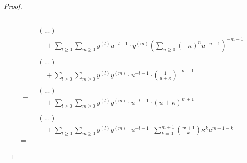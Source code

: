 \begin{proof}
\begin{enumerate}
$$\begin{aligned}
\begin{aligned}
                                    \end{aligned}
                                    \\
                                    & =
                                    \begin{aligned}
                                        & (...)
                                        \\
                                        & \quad + \sum_{l \geq 0} \sum_{m \geq 0} y^{(l)} u^{-l - 1} \cdot y^{(m)} \left( \sum_{n \geq 0} (-\kappa)^n u^{-n - 1} \right)^{-m - 1}
                                    \end{aligned}
                                    \\
                                    & =
                                    \begin{aligned}
                                        & (...)
                                        \\
                                        & \quad + \sum_{l \geq 0} \sum_{m \geq 0} y^{(l)} y^{(m)} \cdot u^{-l - 1} \cdot \left( \frac{1}{u + \kappa} \right)^{-m - 1}
                                    \end{aligned}
                                    \\
                                    & =
                                    \begin{aligned}
                                        & (...)
                                        \\
                                        & \quad + \sum_{l \geq 0} \sum_{m \geq 0} y^{(l)} y^{(m)} \cdot u^{-l - 1} \cdot (u + \kappa)^{m + 1}
                                    \end{aligned}
                                    \\
                                    & = 
                                    \begin{aligned}
                                        & (...)
                                        \\
                                        & \quad + \sum_{l \geq 0} \sum_{m \geq 0} y^{(l)} y^{(m)} \cdot u^{-l - 1} \cdot \sum_{k = 0}^{m + 1} \binom{m + 1}{k} \kappa^k u^{m + 1 - k}
                                    \end{aligned}
                                    \\
                                    & =

\end{aligned}$$
\end{enumerate}
\end{proof}
